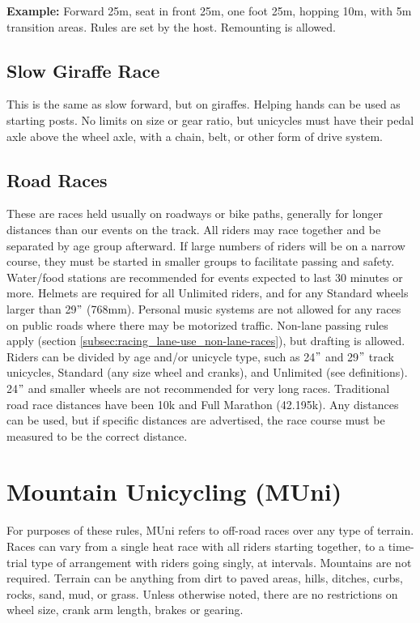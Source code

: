 \textbf{Example:} Forward 25m, seat in front 25m, one foot 25m, hopping 10m, with 5m transition areas.
Rules are set by the host.
Remounting is allowed.

\subsection{Slow Giraffe Race}
This is the same as slow forward, but on giraffes.
Helping hands can be used as starting posts.
No limits on size or gear ratio, but unicycles must have their pedal axle above the wheel axle, with a chain, belt, or other form of drive system.

\subsection{Road Races}
These are races held usually on roadways or bike paths, generally for longer distances than our events on the track.
All riders may race together and be separated by age group afterward.
If large numbers of riders will be on a narrow course, they must be started in smaller groups to facilitate passing and safety.
Water/food stations are recommended for events expected to last 30 minutes or more.
Helmets are required for all Unlimited riders, and for any Standard wheels larger than 29$"$ (768mm).
Personal music systems are not allowed for any races on public roads where there may be motorized traffic.
Non-lane passing rules apply (section \ref{subsec:racing_lane-use_non-lane-races}), but drafting is allowed.
Riders can be divided by age and/or unicycle type, such as 24$"$ and 29$"$ track unicycles, Standard (any size wheel and cranks), and Unlimited (see definitions).
24$"$ and smaller wheels are not recommended for very long races.
Traditional road race distances have been 10k and Full Marathon (42.195k).
Any distances can be used, but if specific distances are advertised, the race course must be measured to be the correct distance.

\section{Mountain Unicycling (MUni) \label{sec:racing_muni}}
For purposes of these rules, MUni refers to off-road races over any type of terrain.
Races can vary from a single heat race with all riders starting together, to a time-trial type of arrangement with riders going singly, at intervals.
Mountains are not required.
Terrain can be anything from dirt to paved areas, hills, ditches, curbs, rocks, sand, mud, or grass.
Unless otherwise noted, there are no restrictions on wheel size, crank arm length, brakes or gearing.


